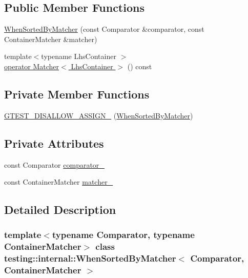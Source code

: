 \subsection*{Public Member Functions}
\begin{DoxyCompactItemize}
\item 
\hyperlink{classtesting_1_1internal_1_1WhenSortedByMatcher_a5c5e625b3f0be9f7380f5be744f61b1c}{When\+Sorted\+By\+Matcher} (const Comparator \&comparator, const Container\+Matcher \&matcher)
\item 
{\footnotesize template$<$typename Lhs\+Container $>$ }\\\hyperlink{classtesting_1_1internal_1_1WhenSortedByMatcher_ae76285fee36055ffde63492102d3c67f}{operator Matcher$<$ Lhs\+Container $>$} () const
\end{DoxyCompactItemize}
\subsection*{Private Member Functions}
\begin{DoxyCompactItemize}
\item 
\hyperlink{classtesting_1_1internal_1_1WhenSortedByMatcher_a123a50e78beca9a4a4f7b7cb4c9e18d5}{G\+T\+E\+S\+T\+\_\+\+D\+I\+S\+A\+L\+L\+O\+W\+\_\+\+A\+S\+S\+I\+G\+N\+\_\+} (\hyperlink{classtesting_1_1internal_1_1WhenSortedByMatcher}{When\+Sorted\+By\+Matcher})
\end{DoxyCompactItemize}
\subsection*{Private Attributes}
\begin{DoxyCompactItemize}
\item 
const Comparator \hyperlink{classtesting_1_1internal_1_1WhenSortedByMatcher_adea7dca9b0e3b5d2ab198cc9c29b1c2d}{comparator\+\_\+}
\item 
const Container\+Matcher \hyperlink{classtesting_1_1internal_1_1WhenSortedByMatcher_ab873ba633a5f7dfc46440e8f2c9d5611}{matcher\+\_\+}
\end{DoxyCompactItemize}


\subsection{Detailed Description}
\subsubsection*{template$<$typename Comparator, typename Container\+Matcher$>$\newline
class testing\+::internal\+::\+When\+Sorted\+By\+Matcher$<$ Comparator, Container\+Matcher $>$}



